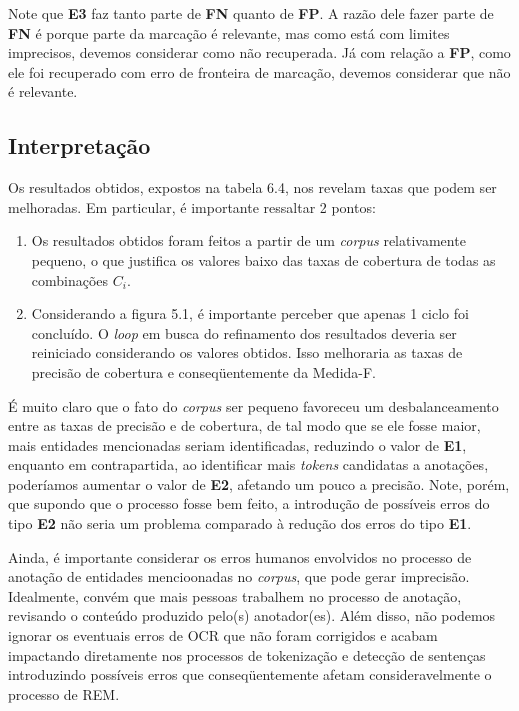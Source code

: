 \documentclass[11pt]{report}
\begin{document}
Note que \textbf{E3} faz tanto parte de \textbf{FN} quanto de \textbf{FP}. A razão dele fazer parte de \textbf{FN} é porque parte da marcação é relevante, mas como está com limites imprecisos, devemos considerar como não recuperada. Já com relação a \textbf{FP}, como ele foi recuperado com erro de fronteira de marcação, devemos considerar que não é relevante.

\subsection{Interpretação}

\indent\indent Os resultados obtidos, expostos na tabela 6.4, nos revelam taxas que podem ser melhoradas. Em particular, é importante ressaltar 2 pontos:

\begin{enumerate}[label={\textbf{\arabic*.}}]
\item Os resultados obtidos foram feitos a partir de um \textit{corpus} relativamente pequeno, o que justifica os valores baixo das taxas de cobertura de todas as combinações $C_i$.
\item Considerando a figura 5.1, é importante perceber que apenas 1 ciclo foi concluído. O \textit{loop} em busca do refinamento dos resultados deveria ser reiniciado considerando os
valores obtidos. Isso melhoraria as taxas de precisão de cobertura e conseqüentemente da Medida-F.
\end{enumerate}

É muito claro que o fato do \textit{corpus} ser pequeno favoreceu um desbalanceamento entre as taxas de precisão e de cobertura, de tal modo que se ele fosse maior, mais entidades mencionadas
seriam identificadas, reduzindo o valor de \textbf{E1}, enquanto em contrapartida, ao identificar mais \textit{tokens} candidatas a anotações, poderíamos aumentar o valor de \textbf{E2}, afetando um pouco a precisão. Note, porém, que supondo que o processo fosse bem feito, a introdução de possíveis erros do tipo \textbf{E2} não seria um problema comparado à redução dos
erros do tipo \textbf{E1}.

Ainda, é importante considerar os erros humanos envolvidos no processo de anotação de entidades mencioonadas no \textit{corpus}, que pode gerar imprecisão. Idealmente, convém que mais
pessoas trabalhem no processo de anotação, revisando o conteúdo produzido pelo(s) anotador(es). Além disso, não podemos ignorar os eventuais erros de OCR que não foram corrigidos
e acabam impactando diretamente nos processos de tokenização e detecção de sentenças introduzindo possíveis erros que conseqüentemente afetam consideravelmente o processo de REM.
\end{document}
